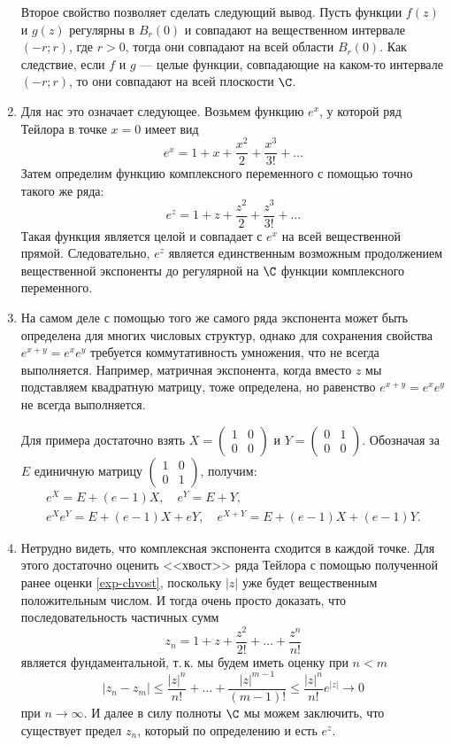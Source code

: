 \begin{enumerate}
Второе свойство позволяет сделать следующий вывод. Пусть функции $f(z)$ и $g(z)$ регулярны в $B_r(0)$ и совпадают на вещественном интервале $(-r;r)$, где $r>0$, тогда они совпадают на всей области $B_r(0)$. Как следствие, если $f$ и $g$ --- целые функции, совпадающие на каком-то интервале $(-r;r)$, то они совпадают на всей плоскости $\C$.



\item Для нас это означает следующее. Возьмем функцию $e^x$, у которой ряд Тейлора в точке $x=0$ имеет вид
$$
e^x = 1+x+\frac{x^2}{2}+\frac{x^3}{3!}+\dots
$$
Затем определим функцию комплексного переменного с помощью точно такого же ряда:
$$
e^z = 1+z+\frac{z^2}{2}+\frac{z^3}{3!}+\dots
$$
Такая функция является целой и совпадает с $e^x$ на всей вещественной прямой. Следовательно, $e^z$ является единственным возможным продолжением вещественной экспоненты до регулярной на $\C$ функции комплексного переменного.



\item На самом деле с помощью того же самого ряда экспонента может быть определена для многих числовых структур, однако для сохранения свойства $e^{x+y}=e^xe^y$ требуется коммутативность умножения, что не всегда выполняется. Например, матричная экспонента, когда вместо $z$ мы подставляем квадратную матрицу, тоже определена, но равенство $e^{x+y}=e^xe^y$ не всегда выполняется.

Для примера достаточно взять $X=\begin{pmatrix}1 & 0\\ 0 & 0\end{pmatrix}$ и $Y=\begin{pmatrix}0 & 1\\ 0 & 0\end{pmatrix}$. Обозначая за $E$ единичную матрицу $\begin{pmatrix}1 & 0\\ 0 & 1\end{pmatrix}$,
получим:
\begin{gather*}
e^X = E+(e-1)X,\quad e^Y = E+Y,\\
e^Xe^Y = E+(e-1)X+eY,\quad e^{X+Y}=E+(e-1)X+(e-1)Y.
\end{gather*}

\item Нетрудно видеть, что комплексная экспонента сходится в каждой точке. Для этого достаточно оценить <<хвост>> ряда Тейлора с помощью полученной ранее оценки \eqref{exp-chvost}, поскольку $|z|$ уже будет вещественным положительным числом. И тогда очень просто доказать, что последовательность частичных сумм
$$
z_n=1+z+\frac{z^2}{2!}+\dots+\frac{z^n}{n!}
$$
является фундаментальной, т.\,к. мы будем иметь оценку при $n<m$
$$
|z_n-z_m|\le \frac{|z|^n}{n!}+\dots+\frac{|z|^{m-1}}{(m-1)!}\le \frac{|z|^n}{n!}e^{|z|}\to 0
$$
при $n\to\infty$. И далее в силу полноты $\C$ мы можем заключить, что существует предел $z_n$, который по определению и есть $e^z$.


\end{enumerate}
